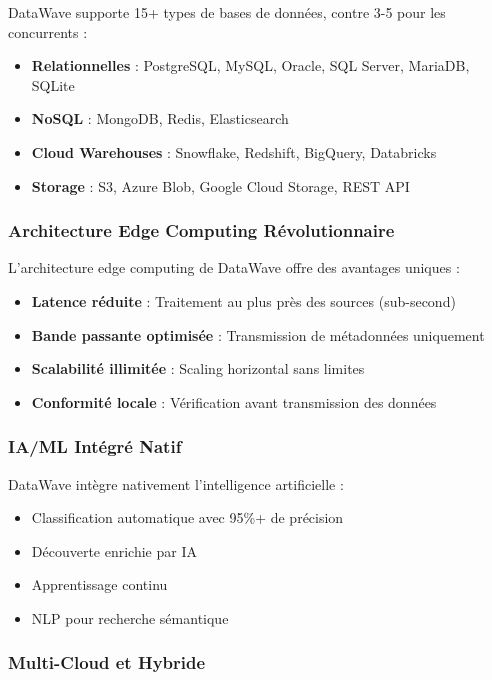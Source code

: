 DataWave supporte 15+ types de bases de données, contre 3-5 pour les concurrents :
\begin{itemize}
    \item \textbf{Relationnelles} : PostgreSQL, MySQL, Oracle, SQL Server, MariaDB, SQLite
    \item \textbf{NoSQL} : MongoDB, Redis, Elasticsearch
    \item \textbf{Cloud Warehouses} : Snowflake, Redshift, BigQuery, Databricks
    \item \textbf{Storage} : S3, Azure Blob, Google Cloud Storage, REST API
\end{itemize}

\subsubsection{Architecture Edge Computing Révolutionnaire}

L'architecture edge computing de DataWave offre des avantages uniques :
\begin{itemize}
    \item \textbf{Latence réduite} : Traitement au plus près des sources (sub-second)
    \item \textbf{Bande passante optimisée} : Transmission de métadonnées uniquement
    \item \textbf{Scalabilité illimitée} : Scaling horizontal sans limites
    \item \textbf{Conformité locale} : Vérification avant transmission des données
\end{itemize}

\subsubsection{IA/ML Intégré Natif}

DataWave intègre nativement l'intelligence artificielle :
\begin{itemize}
    \item Classification automatique avec 95\%+ de précision
    \item Découverte enrichie par IA
    \item Apprentissage continu
    \item NLP pour recherche sémantique
\end{itemize}

\subsubsection{Multi-Cloud et Hybride}

